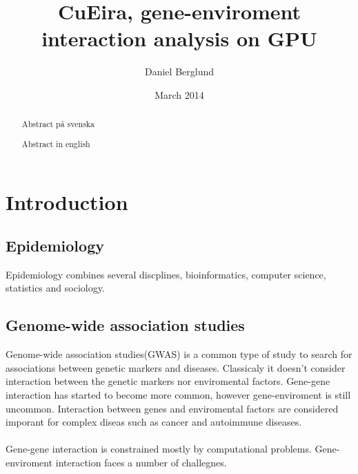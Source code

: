 \documentclass[10pt,a4paper]{article}
\title{CuEira, gene-enviroment interaction analysis on GPU}
\author{Daniel Berglund}
\date{March 2014}
\makeatletter
\newcommand\ackname{Acknowledgements}
\newenvironment{acknowledgements}{
      \titlepage
      \null\vfil
      \@beginparpenalty\@lowpenalty
      \begin{center}%
        \bfseries \ackname
        \@endparpenalty\@M
      \end{center}}%
     {\par\vfil\null\endtitlepage}
\newenvironment{acknowledgements}{
      \if@twocolumn
        \section*{\abstractname}
      \else
        \small
        \begin{center}
          {\bfseries \ackname\vspace{-.5em}\vspace{\z@}}
        \end{center}
        \quotation
      \fi}
      {\if@twocolumn\else\endquotation\fi}
\makeatother
\begin{document}
\maketitle

\clearpage
{}
\begin{abstract}
Abstract på svenska
\end{abstract}
\clearpage
{}
\begin{abstract}
Abstract in english
\end{abstract}
\clearpage
\tableofcontents
\newpage

\section{Introduction}
\subsection{Epidemiology}
Epidemiology combines several discplines, bioinformatics, computer science, statistics and sociology.

\cite{rothman1998modern,rothman2002intro_epidemiology}

\subsection{Genome-wide association studies}
Genome-wide association studies(GWAS) is a common type of study to search for associations between genetic markers and diseases. Classicaly it doesn't consider interaction between the genetic markers nor enviromental factors. Gene-gene interaction has started to become more common\cite{cordell_detect_review}, however gene-enviroment is still uncommon\cite{gene_enviroment_2013}. Interaction between genes and enviromental factors are considered imporant for complex diseas such as cancer and autoimmune diseases. \cite{cordell_detect_review, gene_enviroment_2013, geira, ra_smoking}\\
\\
Gene-gene interaction is constrained mostly by computational problems\cite{cordell_detect_review}. Gene-enviroment interaction faces a number of challegnes.
\end{document}

